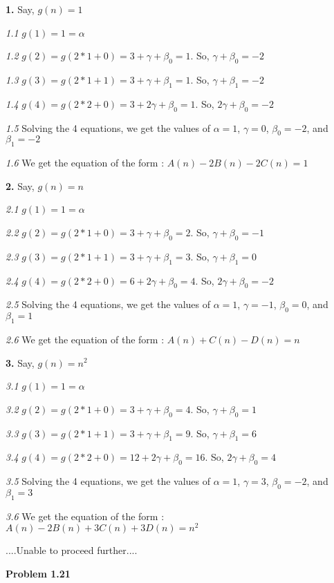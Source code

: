 \documentclass[12pt]{article}
\begin{document}
{\bf 1.} Say, $g(n) = 1$

{\textit {1.1}} $g(1) = 1 = \alpha$

{\textit {1.2}} $g(2) = g(2*1 + 0) = 3+ \gamma + \beta _0 = 1$. 
So, $\gamma + \beta _0 = -2$

{\textit {1.3}} $g(3) = g(2*1 + 1) = 3+ \gamma + \beta _1 = 1$.
So, $\gamma + \beta _1 = -2$

{\textit {1.4}} $g(4) = g(2*2 + 0) = 3+ 2\gamma + \beta _0 = 1$.
So, $2\gamma + \beta _0 = -2$

{\textit {1.5}} Solving the 4 equations, we get the values of $\alpha = 1$, $\gamma = 0$, $\beta _0 = -2$, and $\beta _1 = -2$

{\textit {1.6}} We get the equation of the form : $A(n)-2B(n)-2C(n) = 1$

{\bf 2.} Say, $g(n) = n$

{\textit {2.1}} $g(1) = 1 = \alpha$

{\textit {2.2}} $g(2) = g(2*1 + 0) = 3+ \gamma + \beta _0 = 2$.
So, $\gamma + \beta _0 = -1$

{\textit {2.3}} $g(3) = g(2*1 + 1) = 3+ \gamma + \beta _1 = 3$.
So, $\gamma + \beta _1 = 0$

{\textit {2.4}} $g(4) = g(2*2 + 0) = 6+ 2\gamma + \beta _0 = 4$.
So, $2\gamma + \beta _0 = -2$

{\textit {2.5}} Solving the 4 equations, we get the values of $\alpha = 1$, $\gamma = -1$, $\beta _0 = 0$, and $\beta _1 = 1$

{\textit {2.6}} We get the equation of the form : $A(n)+C(n)-D(n) = n$

{\bf 3.} Say, $g(n) = n^2$

{\textit {3.1}} $g(1) = 1 = \alpha$

{\textit {3.2}} $g(2) = g(2*1 + 0) = 3+ \gamma + \beta _0 = 4$.
So, $\gamma + \beta _0 = 1$

{\textit {3.3}} $g(3) = g(2*1 + 1) = 3+ \gamma + \beta _1 = 9$.
So, $\gamma + \beta _1 = 6$

{\textit {3.4}} $g(4) = g(2*2 + 0) = 12+ 2\gamma + \beta _0 = 16$.
So, $2\gamma + \beta _0 = 4$

{\textit {3.5}} Solving the 4 equations, we get the values of $\alpha = 1$, $\gamma = 3$, $\beta _0 = -2$, and $\beta _1 = 3$

{\textit {3.6}} We get the equation of the form : $A(n)-2B(n)+3C(n)+3D(n) = n^2$

....Unable to proceed further....

\noindent
{\bf Problem 1.21}
\end{document}
